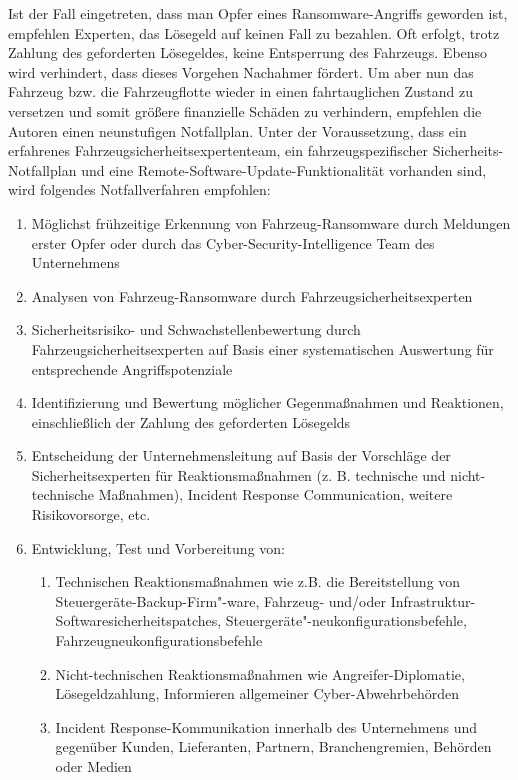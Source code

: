 Ist der Fall eingetreten, dass man Opfer eines Ransomware-Angriffs geworden ist, empfehlen Experten, 
das Lösegeld auf keinen Fall zu bezahlen. Oft erfolgt, trotz Zahlung des geforderten Lösegeldes, keine 
Entsperrung des Fahrzeugs. Ebenso wird verhindert, dass dieses Vorgehen Nachahmer fördert. 
\newline
Um aber nun das Fahrzeug bzw. die Fahrzeugflotte wieder in einen fahrtauglichen Zustand zu versetzen und 
somit größere finanzielle Schäden zu verhindern, empfehlen die Autoren einen neunstufigen Notfallplan. 
Unter der Voraussetzung, dass ein erfahrenes Fahrzeugsicherheitsexpertenteam, ein fahrzeugspezifischer 
Sicherheits-Notfallplan und eine Remote-Software-Update-Funktionalität vorhanden sind, wird folgendes 
Notfallverfahren empfohlen:

\begin{enumerate}
    \item Möglichst frühzeitige Erkennung von Fahrzeug-Ransomware durch Meldungen erster Opfer 
    oder durch das Cyber-Security-Intelligence Team des Unternehmens
    \item Analysen von Fahrzeug-Ransomware durch Fahrzeugsicherheitsexperten
    \item Sicherheitsrisiko- und Schwachstellenbewertung durch Fahrzeugsicherheitsexperten auf Basis 
    einer systematischen Auswertung für entsprechende Angriffspotenziale 
    \item Identifizierung und Bewertung möglicher Gegenmaßnahmen und Reaktionen, einschließlich der 
    Zahlung des geforderten Lösegelds
    \item Entscheidung der Unternehmensleitung auf Basis der Vorschläge der Sicherheitsexperten für 
    Reaktionsmaßnahmen (z. B. technische und nicht-technische Maßnahmen), Incident Response Communication, 
    weitere Risikovorsorge, etc.
    \item Entwicklung, Test und Vorbereitung von:
    \begin{enumerate}
        \item Technischen Reaktionsmaßnahmen wie z.B. die Bereitstellung von Steuergeräte-Backup-Firm"-ware, 
        Fahrzeug- und/oder Infrastruktur-Softwaresicherheitspatches, Steuergeräte"-neukonfigurationsbefehle,
        Fahrzeugneukonfigurationsbefehle
        \item Nicht-technischen Reaktionsmaßnahmen wie Angreifer-Diplomatie, Lösegeldzahlung, Informieren 
        allgemeiner Cyber-Abwehrbehörden
        \item Incident Response-Kommunikation innerhalb des Unternehmens und gegenüber Kunden, Lieferanten, 
        Partnern, Branchengremien, Behörden oder Medien
    \end{enumerate}


\end{enumerate}
